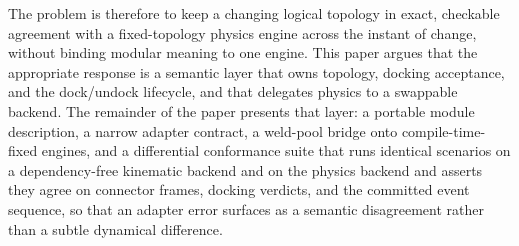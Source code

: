The problem is therefore to keep a changing logical topology in exact, checkable
agreement with a fixed-topology physics engine across the instant of change,
without binding modular meaning to one engine. This paper argues that the
appropriate response is a semantic layer that owns topology, docking acceptance,
and the dock/undock lifecycle, and that delegates physics to a swappable backend.
The remainder of the paper presents that layer: a portable module description, a
narrow adapter contract, a weld-pool bridge onto compile-time-fixed engines, and
a differential conformance suite that runs identical scenarios on a
dependency-free kinematic backend and on the physics backend and asserts they
agree on connector frames, docking verdicts, and the committed event sequence,
so that an adapter error surfaces as a semantic disagreement rather than a
subtle dynamical difference.
